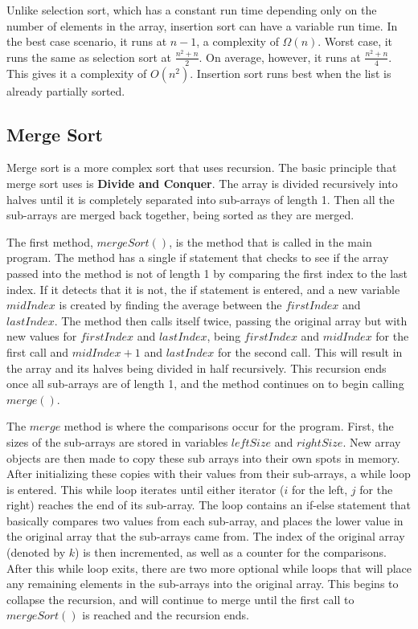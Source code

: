 \documentclass[letterpaper, 10pt,DIV=13]{scrartcl}
\numberwithin{equation}{section} %
\numberwithin{figure}{section} %
\numberwithin{table}{section} %
\begin{document}
Unlike selection sort, which has a constant run time depending only on the number of elements in the array, insertion sort can have a variable run time. In the best case scenario, it runs at $n - 1$, a complexity of $\Omega(n)$. Worst case, it runs the same as selection sort at $\frac{n^2 + n}{2}$. On average, however, it runs at $\frac{n^2 + n}{4}$. This gives it a complexity of $O(n^2)$. Insertion sort runs best when the list is already partially sorted.

\subsection{Merge Sort}
Merge sort is a more complex sort that uses recursion. The basic principle that merge sort uses is \textbf{Divide and Conquer}. The array is divided recursively into halves until it is completely separated into sub-arrays of length 1. Then all the sub-arrays are merged back together, being sorted as they are merged. 

The first method, $mergeSort()$, is the method that is called in the main program. The method has a single if statement that checks to see if the array passed into the method is not of length 1 by comparing the first index to the last index. If it detects that it is not, the if statement is entered, and a new variable $midIndex$ is created by finding the average between the $firstIndex$ and $lastIndex$. The method then calls itself twice, passing the original array but with new values for $firstIndex$ and $lastIndex$, being $firstIndex$ and $midIndex$ for the first call and $midIndex + 1$ and $lastIndex$ for the second call. This will result in the array and its halves being divided in half recursively. This recursion ends once all sub-arrays are of length 1, and the method continues on to begin calling $merge()$.

The $merge$ method is where the comparisons occur for the program. First, the sizes of the sub-arrays are stored in variables $leftSize$ and $rightSize$. New array objects are then made to copy these sub arrays into their own spots in memory. After initializing these copies with their values from their sub-arrays, a while loop is entered. This while loop iterates until either iterator ($i$ for the left, $j$ for the right) reaches the end of its sub-array. The loop contains an if-else statement that basically compares two values from each sub-array, and places the lower value in the original array that the sub-arrays came from. The index of the original array (denoted by $k$) is then incremented, as well as a counter for the comparisons. After this while loop exits, there are two more optional while loops that will place any remaining elements in the sub-arrays into the original array. This begins to collapse the recursion, and will continue to merge until the first call to $mergeSort()$ is reached and the recursion ends.
\end{document}
